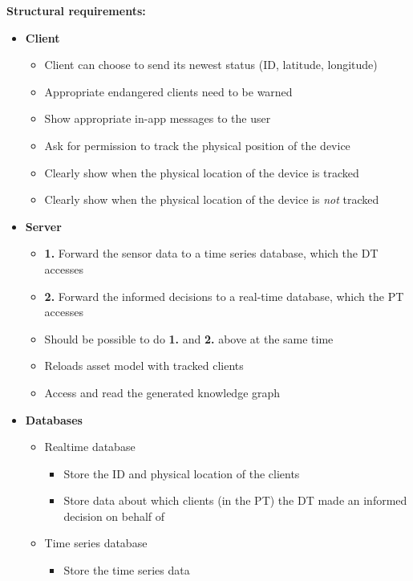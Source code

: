 \documentclass{article}
\begin{document}
\noindent\textbf{Structural requirements:}
\begin{itemize}
    \item \textbf{Client}
    \begin{itemize}
        \item Client can choose to send its newest status (ID, latitude, longitude) 
        \item Appropriate endangered clients need to be warned 
        \item Show appropriate in-app messages to the user
        \item Ask for permission to track the physical position of the device
        \item Clearly show when the physical location of the device is tracked
        \item Clearly show when the physical location of the device is \emph{not} tracked
    \end{itemize}
    \item \textbf{Server}
    \begin{itemize}
        \item \textbf{1.} Forward the sensor data to a time series database, which the DT accesses
        \item \textbf{2.} Forward the informed decisions to a real-time database, which the PT accesses
        \item Should be possible to do \textbf{1.} and \textbf{2.} above at the same time
        \item Reloads asset model with tracked clients
        \item Access and read the generated knowledge graph
    \end{itemize}
    \item \textbf{Databases}
    \begin{itemize}
        \item Realtime database
        \begin{itemize}
            \item Store the ID and physical location of the clients
            \item Store data about which clients (in the PT) the DT made an informed decision on behalf of
        \end{itemize}
        \item Time series database
        \begin{itemize}
            \item Store the time series data
        \end{itemize}

\end{itemize}
\end{itemize}
\end{document}
